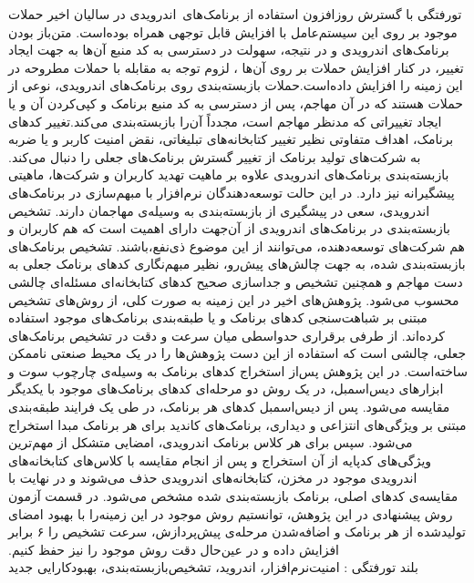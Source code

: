 


‌تورفتگی
‫با گسترش روزافزون استفاده از برنامک‌های\ اندرویدی  در سالیان اخیر حملات موجود بر روی این سیستم‌عامل با افزایش قابل توجهی همراه بوده‌است. متن‌باز بودن برنامک‌های اندرویدی و در نتیجه، سهولت در دسترسی به کد منبع آن‌ها به جهت ایجاد تغییر، در کنار افزایش حملات بر روی آن‌ها ، لزوم توجه به مقابله با حملات مطروحه در این زمینه‌ را افزایش داده‌است.حملات بازبسته‌بندی روی برنامک‌های اندرویدی، نوعی از حملات هستند که در آن مهاجم، پس از دسترسی به کد منبع برنامک و کپی‌کردن آن و یا ایجاد تغییراتی که مدنظر مهاجم است، مجدداً آن‌را بازبسته‌بندی می‌کند.تغییر کد‌های برنامک، اهداف متفاوتی نظیر تغییر کتابخانه‌های تبلیغاتی، نقض امنیت کاربر و یا ضربه به شرکت‌های تولید برنامک‌ از تغییر گسترش برنامک‌های جعلی را دنبال می‌کند. بازبسته‌بندی برنامک‌های اندرویدی علاوه بر ماهیت تهدید کاربران و شرکت‌ها، ماهیتی پیشگیرانه نیز دارد. در این حالت توسعه‌دهندگان نرم‌افزار با مبهم‌سازی در برنامک‌های اندرویدی، سعی در پیشگیری از بازبسته‌بندی به وسیله‌ی مهاجمان دارند. تشخیص بازبسته‌بندی در برنامک‌های اندرویدی از آن‌جهت دارا‌ی اهمیت است که هم کاربران و هم شرکت‌های توسعه‌دهنده، می‌توانند از این موضوع ذی‌نفع،باشند. تشخیص‌ برنامک‌های بازبسته‌بندی شده، به جهت چالش‌های پیش‌رو، نظیر مبهم‌نگاری کد‌های برنامک‌‌ جعلی به دست مهاجم و همچنین تشخیص و جداسازی صحیح کد‌های کتابخانه‌ای مسئله‌ای چالشی محسوب می‌شود. پژوهش‌های اخیر در این زمینه به صورت کلی، از روش‌‌های تشخیص مبتنی بر شباهت‌سنجی کد‌های برنامک و یا طبقه‌بندی برنامک‌های موجود استفاده‌ کرده‌اند. از طرفی برقراری حد‌واسطی میان سرعت‌ و دقت در تشخیص برنامک‌های جعلی، چالشی است که استفاده از این دست پژوهش‌ها را در یک محیط صنعتی ناممکن ساخته‌است. در این پژوهش پس‌از استخراج کد‌های برنامک به وسیله‌ی چارچوب سوت و ابزار‌های دیس‌اسمبل، در یک روش دو مرحله‌ای کد‌های برنامک‌های موجود با یکدیگر مقایسه می‌شود. پس از دیس‌اسمبل کد‌های هر برنامک، در طی یک فرایند طبقه‌بندی مبتنی بر ویژگی‌های انتزاعی و دیداری، برنامک‌های کاندید برای هر برنامک مبدا استخراج می‌شود. سپس برای هر کلاس برنامک‌ اندرویدی، امضایی متشکل از مهم‌ترین ویژگی‌های کد‌پایه از آن استخراج و پس از انجام مقایسه‌ با کلاس‌های کتابخانه‌های اندرویدی موجود در مخزن، کتابخانه‌های اندرویدی حذف می‌شوند و در نهایت با مقایسه‌ی کد‌های اصلی، برنامک‌ بازبسته‌بندی‌ شده مشخص می‌شود.
در قسمت آزمون روش پیشنهادی در این پژوهش، توانستیم روش موجود در این زمینه‌را با بهبود امضا‌ی تولید‌شده از هر برنامک و اضافه‌شدن مرحله‌ی پیش‌پردازش، سرعت تشخیص را ۶ برابر افزایش داده و در عین‌حال دقت روش موجود را نیز حفظ‌ کنیم.  
 \\
‌بلند
‌تورفتگی : 
امنیت‌نرم‌افزار، اندروید، تشخیص‌باز‌بسته‌بندی، بهبود‌کارایی
‌جدید